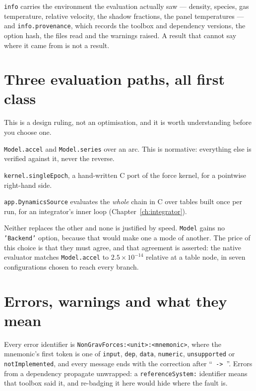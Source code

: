 \documentclass[11pt,a4paper]{report}
\begin{document}
\texttt{info} carries the environment the evaluation actually saw --- density, species, gas
temperature, relative velocity, the shadow fractions, the panel temperatures --- and
\texttt{info.provenance}, which records the toolbox and dependency versions, the option hash, the
files read and the warnings raised. A result that cannot say where it came from is not a result.

\section{Three evaluation paths, all first class}
This is a design ruling, not an optimisation, and it is worth understanding before you choose one.

\begin{description}[leftmargin=1.4em,style=nextline]
\item[The vectorised MATLAB path.] \texttt{Model.accel} and \texttt{Model.series} over an arc. This
 is normative: everything else is verified against it, never the reverse.
\item[The compiled single-epoch kernel.] \texttt{kernel.singleEpoch}, a hand-written C port of the
 force kernel, for a pointwise right-hand side.
\item[The native chain.] \texttt{app.DynamicsSource} evaluates the \emph{whole} chain in C over
 tables built once per run, for an integrator's inner loop (Chapter~\ref{ch:integrator}).
\end{description}

\noindent Neither replaces the other and none is justified by speed. \texttt{Model} gains no
\texttt{'Backend'} option, because that would make one a mode of another. The price of this choice
is that they must agree, and that agreement is asserted: the native evaluator matches
\texttt{Model.accel} to $2.5\times10^{-14}$ relative at a table node, in seven configurations chosen
to reach every branch.

\section{Errors, warnings and what they mean}
Every error identifier is \texttt{NonGravForces:<unit>:<mnemonic>}, where the mnemonic's first token
is one of \texttt{input}, \texttt{dep}, \texttt{data}, \texttt{numeric}, \texttt{unsupported} or
\texttt{notImplemented}, and every message ends with the correction after ``\texttt{ -> }''. Errors
from a dependency propagate unwrapped: a \texttt{referenceSystem:} identifier means that toolbox
said it, and re-badging it here would hide where the fault is.
\end{document}
